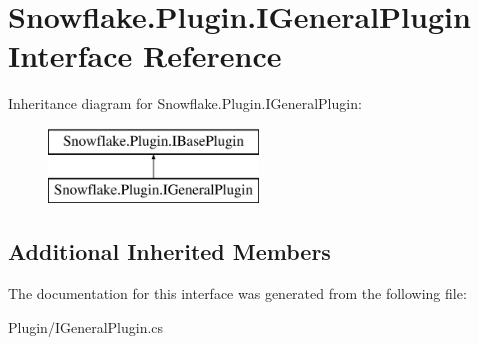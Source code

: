 \hypertarget{interface_snowflake_1_1_plugin_1_1_i_general_plugin}{}\section{Snowflake.\+Plugin.\+I\+General\+Plugin Interface Reference}
\label{interface_snowflake_1_1_plugin_1_1_i_general_plugin}
Inheritance diagram for Snowflake.\+Plugin.\+I\+General\+Plugin\+:\begin{figure}[H]
\begin{center}
\leavevmode
\includegraphics[height=2.000000cm]{interface_snowflake_1_1_plugin_1_1_i_general_plugin}
\end{center}
\end{figure}
\subsection*{Additional Inherited Members}


The documentation for this interface was generated from the following file\+:\begin{DoxyCompactItemize}
\item 
Plugin/I\+General\+Plugin.\+cs\end{DoxyCompactItemize}
